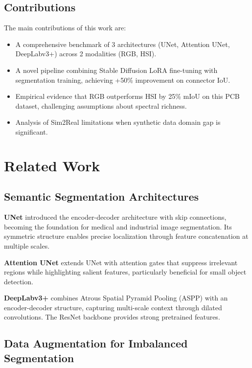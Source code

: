 \documentclass[12pt,a4paper]{article}
\begin{document}
\subsection{Contributions}

The main contributions of this work are:
\begin{itemize}
    \item A comprehensive benchmark of 3 architectures (UNet, Attention UNet, DeepLabv3+) across 2 modalities (RGB, HSI).
    \item A novel pipeline combining Stable Diffusion LoRA fine-tuning with segmentation training, achieving +50\% improvement on connector IoU.
    \item Empirical evidence that RGB outperforms HSI by 25\% mIoU on this PCB dataset, challenging assumptions about spectral richness.
    \item Analysis of Sim2Real limitations when synthetic data domain gap is significant.
\end{itemize}

\section{Related Work}

\subsection{Semantic Segmentation Architectures}

\textbf{UNet} \cite{ronneberger2015unet} introduced the encoder-decoder architecture with skip connections, becoming the foundation for medical and industrial image segmentation. Its symmetric structure enables precise localization through feature concatenation at multiple scales.

\textbf{Attention UNet} \cite{oktay2018attention} extends UNet with attention gates that suppress irrelevant regions while highlighting salient features, particularly beneficial for small object detection.

\textbf{DeepLabv3+} \cite{chen2018deeplab} combines Atrous Spatial Pyramid Pooling (ASPP) with an encoder-decoder structure, capturing multi-scale context through dilated convolutions. The ResNet backbone provides strong pretrained features.

\subsection{Data Augmentation for Imbalanced Segmentation}
\end{document}
